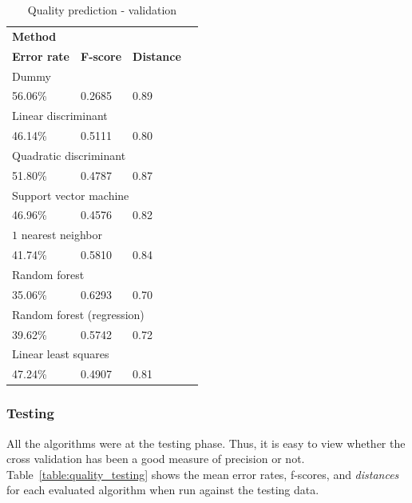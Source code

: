 \documentclass[twoside]{article}
\begin{document}
\begin{multicols}{2}
\begin{table}[H]
\caption{Quality prediction - validation}
\label{table:quality_validation}
\centering
\begin{tabular}{llll}
\multicolumn{3}{l}{\textbf{Method}} \\
\textbf{Error rate} & \textbf{F-score} & \textbf{Distance} \\
\midrule
\multicolumn{3}{l}{Dummy} \\
56.06\% & 0.2685 & 0.89 \\
\multicolumn{3}{l}{Linear discriminant} \\
46.14\% & 0.5111 & 0.80 \\
\multicolumn{3}{l}{Quadratic discriminant} \\
51.80\% & 0.4787 & 0.87 \\
\multicolumn{3}{l}{Support vector machine} \\
46.96\% & 0.4576 & 0.82 \\
\multicolumn{3}{l}{$1$ nearest neighbor} \\
41.74\% & 0.5810 & 0.84 \\
\multicolumn{3}{l}{Random forest} \\
35.06\% & 0.6293 & 0.70 \\
\multicolumn{3}{l}{Random forest (regression)} \\
39.62\% & 0.5742 & 0.72 \\
\multicolumn{3}{l}{Linear least squares} \\
47.24\% & 0.4907 & 0.81 \\
\end{tabular}
\end{table}

\subsubsection{Testing}

All the algorithms were at the testing phase. Thus, it is easy to view whether the cross validation has been a good measure of precision or not.
Table~\ref{table:quality_testing} shows the mean error rates, f-scores, and \emph{distances} for each evaluated algorithm when run against the testing data.


\end{multicols}
\end{document}

